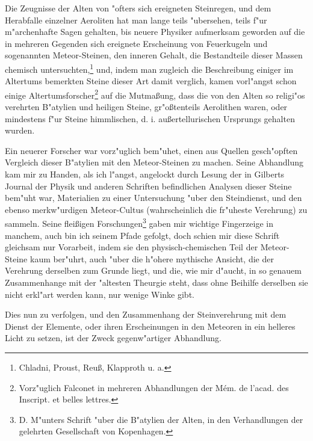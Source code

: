 \documentclass[a4paper, 11pt, oneside, polutonikogreek, german]{article}
\begin{document}
Die Zeugnisse der Alten von "ofters sich ereigneten Steinregen, und dem Herabfalle einzelner Aeroliten hat man lange teils "ubersehen, teils f"ur m"archenhafte Sagen gehalten, bis neuere Physiker aufmerksam geworden auf die in mehreren Gegenden sich ereignete Erscheinung von Feuerkugeln und sogenannten Meteor-Steinen, den inneren Gehalt, die Bestandteile dieser Massen chemisch untersuchten,\footnote{Chladni, Proust, Reuß, Klapproth u. a.} und, indem man zugleich die Beschreibung einiger im Altertums bemerkten Steine dieser Art damit verglich, kamen vorl"angst schon einige Altertumsforscher\footnote{Vorz"uglich Falconet in mehreren Abhandlungen der Mém. de l'acad. des Inscript. et belles lettres.} auf die Mutmaßung, dass die von den Alten so religi"os verehrten B"atylien und heiligen Steine, gr"oßtenteils Aerolithen waren, oder mindestens f"ur Steine himmlischen, d. i. außertellurischen Ursprungs gehalten wurden.

Ein neuerer Forscher war vorz"uglich bem"uhet, einen aus Quellen gesch"opften Vergleich dieser B"atylien mit den Meteor-Steinen zu machen. Seine Abhandlung kam mir zu Handen, als ich l"angst, angelockt durch Lesung der in Gilberts Journal der Physik und anderen Schriften befindlichen Analysen dieser Steine bem"uht war, Materialien zu einer Untersuchung "uber den Steindienst, und den ebenso merkw"urdigen Meteor-Cultus (wahrscheinlich die fr"uheste Verehrung) zu sammeln. Seine fleißigen Forschungen\footnote{D. M"unters Schrift "uber die B"atylien der Alten, in den Verhandlungen der gelehrten Gesellschaft von Kopenhagen.} gaben mir wichtige Fingerzeige in manchem, auch bin ich seinem Pfade gefolgt, doch schien mir diese Schrift gleichsam nur Vorarbeit, indem sie den physisch-chemischen Teil der Meteor-Steine kaum ber"uhrt, auch "uber die h"ohere mythische Ansicht, die der Verehrung derselben zum Grunde liegt, und die, wie mir d"aucht, in so genauem Zusammenhange mit der "altesten Theurgie steht, dass ohne Beihilfe derselben sie nicht erkl"art werden kann, nur wenige Winke gibt.

Dies nun zu verfolgen, und den Zusammenhang der Steinverehrung mit dem Dienst der Elemente, oder ihren Erscheinungen in den Meteoren in ein helleres Licht zu setzen, ist der Zweck gegenw"artiger Abhandlung.
\clearpage
\end{document}
